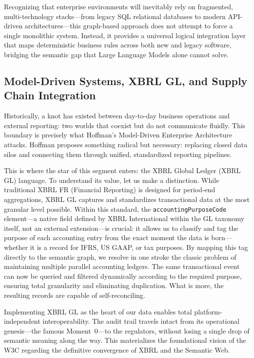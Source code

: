 \documentclass[12pt, a4paper]{article}
\begin{document}
Recognizing that enterprise environments will inevitably rely on fragmented, multi-technology stacks---from legacy SQL relational databases to modern API-driven architectures---this graph-based approach does not attempt to force a single monolithic system. Instead, it provides a universal logical integration layer that maps deterministic business rules across both new and legacy software, bridging the semantic gap that Large Language Models alone cannot solve.

\subsection{Model-Driven Systems, XBRL GL, and Supply Chain Integration}

Historically, a knot has existed between day-to-day business operations and external reporting: two worlds that coexist but do not communicate fluidly. This boundary is precisely what Hoffman's \cite{hoffman2025} Model-Driven Enterprise Architecture attacks. Hoffman proposes something radical but necessary: replacing closed data silos and connecting them through unified, standardized reporting pipelines.

This is where the star of this segment enters: the XBRL Global Ledger (XBRL GL) language. To understand its value, let us make a distinction. While traditional XBRL FR (Financial Reporting) is designed for period-end aggregations, XBRL GL captures and standardizes transactional data at the most granular level possible. Within this standard, the \texttt{accountingPurposeCode} element---a native field defined by XBRL International within the GL taxonomy itself, not an external extension---is crucial: it allows us to classify and tag the purpose of each accounting entry from the exact moment the data is born---whether it is a record for IFRS, US GAAP, or tax purposes. By mapping this tag directly to the semantic graph, we resolve in one stroke the classic problem of maintaining multiple parallel accounting ledgers. The same transactional event can now be queried and filtered dynamically according to the required purpose, ensuring total granularity and eliminating duplication. What is more, the resulting records are capable of self-reconciling.

Implementing XBRL GL as the heart of our data enables total platform-independent interoperability. The audit trail travels intact from its operational genesis---the famous Moment~0---to the regulators, without losing a single drop of semantic meaning along the way. This materializes the foundational vision of the W3C \cite{w3cxbrl} regarding the definitive convergence of XBRL and the Semantic Web.
\end{document}
